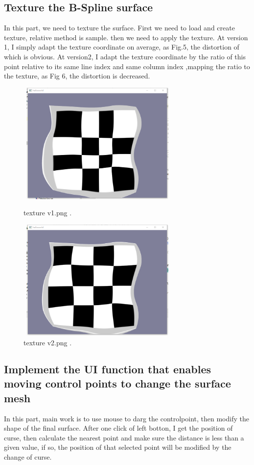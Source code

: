 \documentclass[acmtog]{acmart}
\begin{document}
\subsection{Texture the B-Spline surface }
In this part, we need to texture the surface. First we need to load and create texture, relative method is sample. then we need to apply the texture. At version 1, I simply adapt the texture coordinate on average, as Fig.5, the distortion of which is obvious. At version2, I adapt the texture coordinate by the ratio of this point relative to its same line index and same column index ,mapping the ratio to the texture, as Fig 6,
the distortion is decreased.
\begin{figure}[h]
	\centering
	\includegraphics[width=8cm,height=6cm]{texture v1.png}
	\caption{texture v1.png .}
	
		\centering
	\includegraphics[width=8cm,height=6cm]{texture v2.png}
	\caption{texture v2.png .}
\end{figure}

\begin{figure}[h]

\end{figure}

\subsection{Implement the UI function that enables  moving control points to change the surface mesh}
In this part, main work is to use mouse to darg the controlpoint, then modify the shape of the final surface.
After one click of left botton, I get the position of curse, then calculate the nearest point and make sure the distance is less than a given value, if so, the position of that selected point will be modified by the change of curse.
\end{document}
